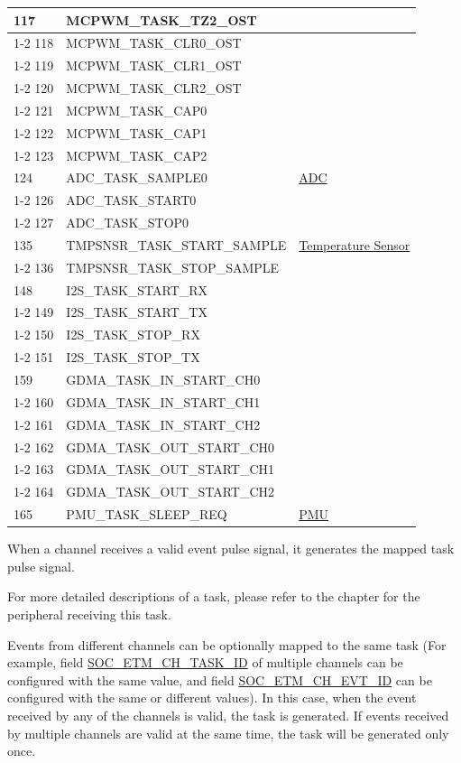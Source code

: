 \documentclass[main\_\_EN.tex]{subfiles}
\begin{document}
\begin{longtable}{ | l | l | l | }
117 & MCPWM\_TASK\_TZ2\_OST  & \\ \cline{1-2}
118 & MCPWM\_TASK\_CLR0\_OST & \\ \cline{1-2}
119 & MCPWM\_TASK\_CLR1\_OST & \\ \cline{1-2}
120 & MCPWM\_TASK\_CLR2\_OST & \\ \cline{1-2}
121 & MCPWM\_TASK\_CAP0      & \\ \cline{1-2}
122 & MCPWM\_TASK\_CAP1      & \\ \cline{1-2}
123 & MCPWM\_TASK\_CAP2      & \\ \hline
124 & ADC\_TASK\_SAMPLE0     & \hyperref[mod:adc]{ADC}   \\ \cline{1-2}
126 & ADC\_TASK\_START0      & \\ \cline{1-2}
127 & ADC\_TASK\_STOP0& \\ \hline
135 & TMPSNSR\_TASK\_START\_SAMPLE  & \hyperref[mod:tmpsen]{Temperature Sensor}      \\ \cline{1-2}
136 & TMPSNSR\_TASK\_STOP\_SAMPLE   & \\ \hline
148 & I2S\_TASK\_START\_RX   & \nameref{mod:i2s}   \\ \cline{1-2}
149 & I2S\_TASK\_START\_TX   & \\ \cline{1-2}
150 & I2S\_TASK\_STOP\_RX    & \\ \cline{1-2}
151 & I2S\_TASK\_STOP\_TX    & \\ \hline
159 & GDMA\_TASK\_IN\_START\_CH0    & \nameref{mod:dma}  \\ \cline{1-2}
160 & GDMA\_TASK\_IN\_START\_CH1    & \\ \cline{1-2}
161 & GDMA\_TASK\_IN\_START\_CH2    & \\ \cline{1-2}
162 & GDMA\_TASK\_OUT\_START\_CH0   & \\ \cline{1-2}
163 & GDMA\_TASK\_OUT\_START\_CH1   & \\ \cline{1-2}
164 & GDMA\_TASK\_OUT\_START\_CH2   & \\ \hline
165 & PMU\_TASK\_SLEEP\_REQ  & \hyperref[mod:lowpowm]{PMU} \\ \hline
\end{longtable}

When a channel receives a valid event pulse signal, it generates the mapped task pulse signal.

For more detailed descriptions of a task, please refer to the chapter for the peripheral receiving this task.

Events from different channels can be optionally mapped to the same task (For example, field \hyperref[fielddesc:SOCETMCH0TASKID]{SOC\_ETM\_CH\_TASK\_ID} of multiple channels can be configured with the same value, and field \hyperref[fielddesc:SOCETMCH0EVTID]{SOC\_ETM\_CH\_EVT\_ID} can be configured with the same or different values). In this case, when the event received by any of the channels is valid, the task is generated. If events received by multiple channels are valid at the same time, the task will be generated only once.
\end{document}
